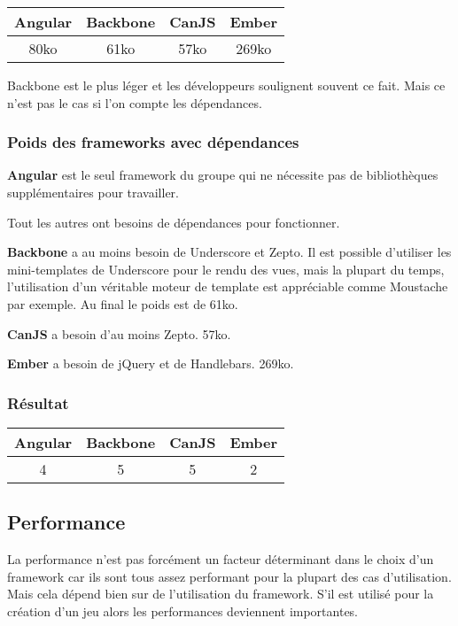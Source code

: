 \begin{tabular}{|c|c|c|c|}
  \hline 
  Angular & Backbone & CanJS & Ember \\
  \hline 
  80ko & 61ko & 57ko & 269ko \\
  \hline
\end{tabular}

Backbone est le plus léger et les développeurs soulignent souvent ce fait. Mais ce n’est pas le cas si l’on compte les dépendances.

\subsubsection{Poids des frameworks avec dépendances}

\textbf{Angular} est le seul framework du groupe qui ne nécessite pas de bibliothèques supplémentaires pour travailler.

Tout les autres ont besoins de dépendances pour fonctionner.

\textbf{Backbone} a au moins besoin de Underscore et Zepto. Il est possible d’utiliser les mini-templates de Underscore pour le rendu des vues, mais la plupart du temps, l’utilisation d’un véritable moteur de template est appréciable comme Moustache par exemple. Au final le poids est de 61ko.

\textbf{CanJS} a besoin d’au moins Zepto. 57ko.

\textbf{Ember} a besoin de jQuery et de Handlebars. 269ko.

\subsubsection{Résultat}
\begin{tabular}{|c|c|c|c|}
  \hline 
  Angular & Backbone & CanJS & Ember \\
  \hline 
  4 & 5 & 5 & 2 \\
  \hline
\end{tabular}


\subsection{Performance}

La performance n’est pas forcément un facteur déterminant dans le choix d’un framework car ils sont tous assez performant pour la plupart des cas d’utilisation. Mais cela dépend bien sur de l’utilisation du framework. S'il est utilisé pour la création d’un jeu alors les performances deviennent importantes.

